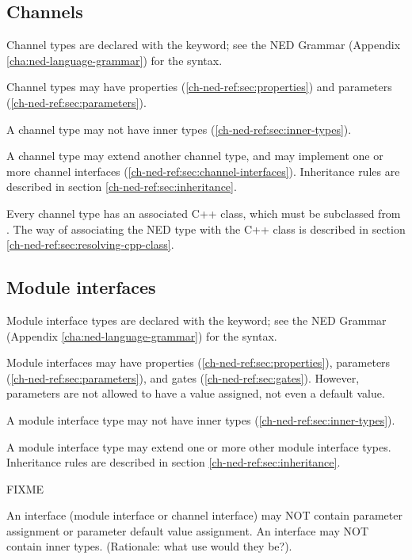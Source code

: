 \subsection{Channels}
\label{ch-ned-ref:sec:channels}

Channel types are declared with the  keyword;
see the NED Grammar (Appendix \ref{cha:ned-language-grammar}) for the
syntax.

Channel types may have properties (\ref{ch-ned-ref:sec:properties})
and parameters (\ref{ch-ned-ref:sec:parameters}).

A channel type may not have inner types (\ref{ch-ned-ref:sec:inner-types}).

A channel type may extend another channel type, and
may implement one or more channel interfaces (\ref{ch-ned-ref:sec:channel-interfaces}).
Inheritance rules are described in section \ref{ch-ned-ref:sec:inheritance}.

Every channel type has an associated C++ class, which must be
subclassed from . The way of associating the
NED type with the C++ class is described in section
\ref{ch-ned-ref:sec:resolving-cpp-class}.



\subsection{Module interfaces}
\label{ch-ned-ref:sec:module-interfaces}

Module interface types are declared with the  keyword;
see the NED Grammar (Appendix \ref{cha:ned-language-grammar}) for the
syntax.

Module interfaces may have properties (\ref{ch-ned-ref:sec:properties}),
parameters (\ref{ch-ned-ref:sec:parameters}), and
gates (\ref{ch-ned-ref:sec:gates}). However, parameters are not allowed
to have a value assigned, not even a default value.

A module interface type may not have inner types (\ref{ch-ned-ref:sec:inner-types}).

A module interface type may extend one or more other module interface types.
Inheritance rules are described in section \ref{ch-ned-ref:sec:inheritance}.


FIXME

An interface (module interface or channel interface) may NOT contain
parameter assignment or parameter default value assignment. An interface
may NOT contain inner types. (Rationale: what use would they be?).

